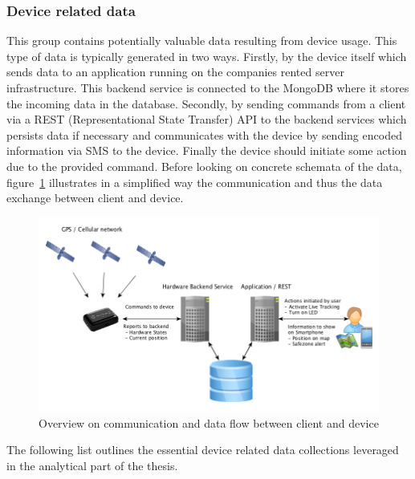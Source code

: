 \subsubsection{Device related data}
\label{sssec:deviceRelatedData}
This group contains potentially valuable data resulting from device usage. This type of data is typically generated in two ways. Firstly, by the device itself which sends data to an application running on the companies rented server infrastructure. This backend service is connected to the MongoDB where it stores the incoming data in the database. Secondly, by sending commands from a client via a REST (Representational State Transfer) API to the backend services which persists data if necessary and communicates with the device by sending encoded information via SMS to the device. Finally the device should initiate some action due to the provided command. Before looking on concrete schemata of the data, figure~\ref{fig:tractiveDataFlow} illustrates in a simplified way the communication and thus the data exchange between client and device. 

\begin{figure}
	\centering
		\includegraphics[width=1.0\textwidth]{img/tractiveDataFlow.png}
	\caption{Overview on communication and data flow between client and device}
	\label{fig:tractiveDataFlow}
\end{figure}

The following list outlines the essential device related data collections leveraged in the analytical part of the thesis. 

